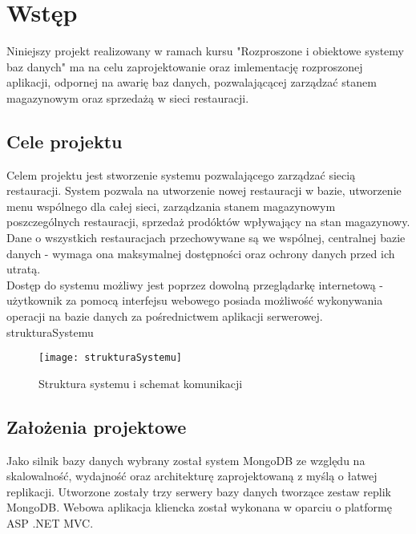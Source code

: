 \section{Wstęp}
Niniejszy projekt realizowany w ramach kursu "Rozproszone i obiektowe systemy baz danych" ma na celu zaprojektowanie oraz imlementację rozproszonej aplikacji, odpornej na awarię baz danych, pozwalającącej zarządzać stanem magazynowym oraz sprzedażą w sieci restauracji.

\subsection{Cele projektu}
Celem projektu jest stworzenie systemu pozwalającego zarządzać siecią restauracji. System pozwala na utworzenie nowej restauracji w bazie, utworzenie menu wspólnego dla całej sieci, zarządzania stanem magazynowym poszczególnych restauracji, sprzedaż prodóktów wpływający na stan magazynowy. Dane o wszystkich restauracjach przechowywane są we wspólnej, centralnej bazie danych - wymaga ona maksymalnej dostępności oraz ochrony danych przed ich utratą. \\
Dostęp do systemu możliwy jest poprzez dowolną przeglądarkę internetową - użytkownik za pomocą interfejsu webowego posiada możliwość wykonywania operacji na bazie danych za pośrednictwem aplikacji serwerowej.
strukturaSystemu

\begin{figure}[H]
	\centering
	\texttt{[image: strukturaSystemu]}
	\caption{Struktura systemu i schemat komunikacji}
\end{figure}


\subsection{Założenia projektowe}
Jako silnik bazy danych wybrany został system MongoDB ze względu na skalowalność, wydajność oraz architekturę zaprojektowaną z myślą o łatwej replikacji. Utworzone zostały trzy serwery bazy danych tworzące zestaw replik MongoDB. Webowa aplikacja kliencka został wykonana w oparciu o platformę ASP .NET MVC. 

